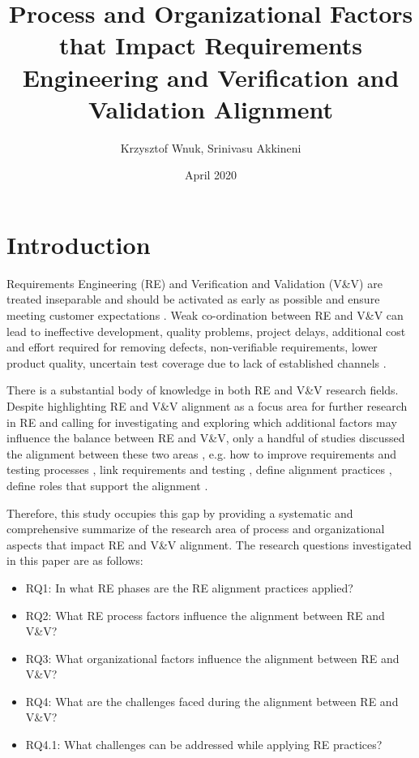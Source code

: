 \documentclass{article}
\title{Process and Organizational Factors that Impact Requirements Engineering and Verification and Validation Alignment}
\author{Krzysztof Wnuk, Srinivasu Akkineni}
\date{April 2020}
\begin{document}
\maketitle

\section{Introduction}
Requirements Engineering (RE) and Verification and Validation (V\&V) are treated inseparable and should be activated as early as possible and ensure meeting customer expectations \cite{wnuk2014delicateS8,bjarnason2014challengesS9}. Weak co-ordination between RE and V\&V can lead to ineffective development, quality problems, project delays,  additional cost and effort required for removing defects, non-verifiable requirements, lower product quality, uncertain test coverage due to lack of established channels \cite{bjarnason2014challengesS9,graham2002requirementsS6,sabaliauskaite2010challengesS3,jones2009enabling}. 

There is a substantial body of knowledge in both RE and V\&V research fields. Despite highlighting RE and V\&V alignment as a focus area for further research in RE  \cite{sabaliauskaite2010challengesS3} \cite{bjarnason2014challengesS9} \cite{cheng2007research} and calling for investigating and exploring which additional factors may influence the balance between RE and V\&V, only a handful of studies discussed the alignment between these two areas \cite{barmi2011alignmentS1}, e.g. how to improve requirements and testing processes \cite{kukkanen2009applying}, link requirements and testing \cite{barmi2011alignmentS1,uusitalo2008linkingS5,watkins1994and}, define alignment practices  \cite{bjarnason2014challengesS9},  define roles that support the alignment  \cite{bjarnason2014challengesS9} \cite{sabaliauskaite2010challengesS3}.

Therefore, this study occupies this gap by providing a systematic and comprehensive summarize of the research area of process and organizational aspects that impact RE and V\&V alignment. The research questions investigated in this paper are as follows: 

\begin{itemize}
    \item RQ1: In what RE phases are the RE alignment practices applied? 
    \item RQ2: What RE process factors influence the alignment between RE and V\&V?
    \item RQ3: What organizational factors influence the alignment between RE and V\&V?
    \item RQ4: What are the challenges faced during the alignment between RE and V\&V?
    \item RQ4.1: What challenges can be addressed while applying RE practices?
\end{itemize}
\end{document}
